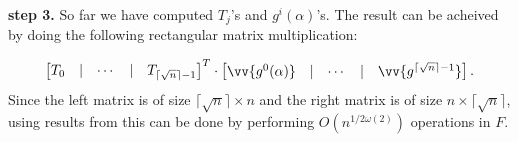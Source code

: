 
\textbf{step 3.} So far we have computed $T_j$'s and $g^i(\alpha)$'s. The result can be acheived by doing the following 
rectangular matrix multiplication:

$$
\begin{bmatrix}
T_0 & \vert & \cdots & \vert &T_{\lceil \sqrt{n} \rceil -1}
\end{bmatrix}^T \cdot
\begin{bmatrix}
\vv{g^0(\alpha)} & \vert & \cdots & \vert & \vv{g^{\lceil \sqrt{n} \rceil -1}}
\end{bmatrix}.
$$
Since the left matrix is of size $\lceil \sqrt{n} \rceil \times n$ and the right matrix is of size $n \times \lceil \sqrt{n} \rceil$,
using results from \cite{LeGall} this can be done by performing $O(n^{1/2\omega(2)})$ operations in $F$.

